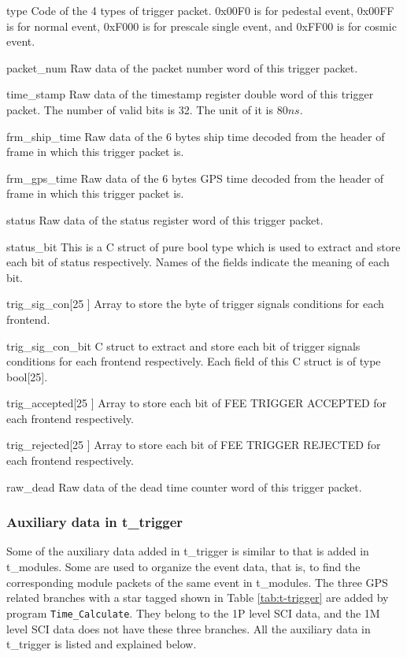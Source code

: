 \documentclass[a4paper, 12pt, onecolumn]{article}
\begin{document}
\begin{asparadesc}
\item[type] Code of the 4 types of trigger packet.
  0x00F0 is for pedestal event, 0x00FF is for normal event, 0xF000 is for prescale single event, and 0xFF00 is for cosmic event.
\item[packet\_num] Raw data of the packet number word of this trigger packet.
\item[time\_stamp] Raw data of the timestamp register double word of this trigger packet. The number of valid bits is 32. The unit of it is $80ns$.
\item[frm\_ship\_time] Raw data of the 6 bytes ship time decoded from the header of frame in which this trigger packet is.
\item[frm\_gps\_time] Raw data of the 6 bytes GPS time decoded from the header of frame in which this trigger packet is.
\item[status] Raw data of the status register word of this trigger packet.
\item[status\_bit] This is a C struct of pure bool type which is used to extract and store each bit of status respectively.
  Names of the fields indicate the meaning of each bit.
\item[trig\_sig\_con[25]] Array to store the byte of trigger signals conditions for each frontend.
\item[trig\_sig\_con\_bit] C struct to extract and store each bit of trigger signals conditions for each frontend respectively.
  Each field of this C struct is of type bool[25].
\item[trig\_accepted[25]] Array to store each bit of FEE TRIGGER ACCEPTED for each frontend respectively.
\item[trig\_rejected[25]] Array to store each bit of FEE TRIGGER REJECTED for each frontend respectively.
\item[raw\_dead] Raw data of the dead time counter word of this trigger packet.
\end{asparadesc}

\subsubsection{Auxiliary data in t\_trigger}
Some of the auxiliary data added in t\_trigger is similar to that is added in t\_modules.
Some are used to organize the event data, that is, to find the corresponding module packets of the same event in t\_modules.
The three GPS related branches with a star tagged shown in Table \ref{tab:t-trigger} are added by program \texttt{Time\_Calculate}. 
They belong to the 1P level SCI data, and the 1M level SCI data does not have these three branches.
All the auxiliary data in t\_trigger is listed and explained below.
\end{document}

